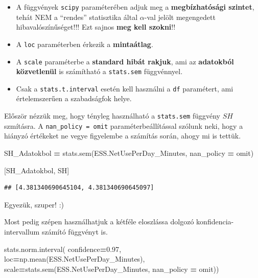 \documentclass[
]{book}
\newenvironment{Shaded}{\begin{snugshade}}{\end{snugshade}}
\newcommand{\FloatTok}[1]{\textcolor[rgb]{0.00,0.00,0.81}{#1}}
\newcommand{\NormalTok}[1]{#1}
\newcommand{\OperatorTok}[1]{\textcolor[rgb]{0.81,0.36,0.00}{\textbf{#1}}}
\newcommand{\StringTok}[1]{\textcolor[rgb]{0.31,0.60,0.02}{#1}}
\providecommand{\tightlist}{%
  \setlength{\itemsep}{0pt}\setlength{\parskip}{0pt}}
\begin{document}
\begin{itemize}
\tightlist
\item
  A függvények \texttt{scipy} paraméterében adjuk meg a \textbf{megbízhatósági szintet}, tehát NEM a ``rendes'' statisztika által \(\alpha\)-val jelölt megengedett hibavalószínűséget!!! Ezt sajnos \textbf{meg kell szokni}!!
\item
  A \texttt{loc} paraméterben érkezik a \textbf{mintaátlag}.
\item
  A \texttt{scale} paraméterbe a \textbf{standard hibát rakjuk}, ami az \textbf{adatokból közvetlenül} is számítható a \texttt{stats.sem} függvénnyel.
\item
  Csak a \texttt{stats.t.interval} esetén kell használni a \texttt{df} paramétert, ami értelemszerűen a szabadságfok helye.
\end{itemize}

Először nézzük meg, hogy tényleg használható a \texttt{stats.sem} függvény \(SH\) szmításra. A \texttt{nan\_policy\ =\ \textquotesingle{}omit\textquotesingle{}} paraméterbeállítással szólunk neki, hogy a hiányzó értékeket ne vegye figyelembe a számítás során, ahogy mi is tettük.

\begin{Shaded}
\begin{Highlighting}[]
\NormalTok{SH\_Adatokbol }\OperatorTok{=}\NormalTok{ stats.sem(ESS.NetUsePerDay\_Minutes, nan\_policy }\OperatorTok{=} \StringTok{\textquotesingle{}omit\textquotesingle{}}\NormalTok{)}

\NormalTok{[SH\_Adatokbol, SH]}
\end{Highlighting}
\end{Shaded}

\begin{verbatim}
## [4.381340690645104, 4.381340690645097]
\end{verbatim}

Egyezük, szuper! :)

Most pedig szépen használhatjuk a kétféle eloszlássa dolgozó konfidencia-intervallum számító függvényt is.

\begin{Shaded}
\begin{Highlighting}[]
\NormalTok{stats.norm.interval(}
\NormalTok{  confidence}\OperatorTok{=}\FloatTok{0.97}\NormalTok{,}
\NormalTok{  loc}\OperatorTok{=}\NormalTok{np.mean(ESS.NetUsePerDay\_Minutes),}
\NormalTok{  scale}\OperatorTok{=}\NormalTok{stats.sem(ESS.NetUsePerDay\_Minutes, nan\_policy }\OperatorTok{=} \StringTok{\textquotesingle{}omit\textquotesingle{}}\NormalTok{))}
\end{Highlighting}
\end{Shaded}
\end{document}
